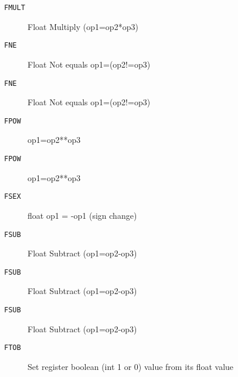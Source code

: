
\begin{description}
\item[\texttt{FMULT      }]  Float Multiply (op1=op2*op3)\\
\end{description}

\begin{description}
\item[\texttt{FNE        }]  Float Not equals op1=(op2!=op3)\\
\end{description}

\begin{description}
\item[\texttt{FNE        }]  Float Not equals op1=(op2!=op3)\\
\end{description}

\begin{description}
\item[\texttt{FPOW       }]  op1=op2**op3\\
\end{description}

\begin{description}
\item[\texttt{FPOW       }]  op1=op2**op3\\
\end{description}

\begin{description}
\item[\texttt{FSEX       }]  float op1 = -op1 (sign change)\\
\end{description}

\begin{description}
\item[\texttt{FSUB       }]  Float Subtract (op1=op2-op3)\\
\end{description}

\begin{description}
\item[\texttt{FSUB       }]  Float Subtract (op1=op2-op3)\\
\end{description}

\begin{description}
\item[\texttt{FSUB       }]  Float Subtract (op1=op2-op3)\\
\end{description}

\begin{description}
\item[\texttt{FTOB       }]  Set register boolean (int 1 or 0) value from its float value\\
\end{description}
